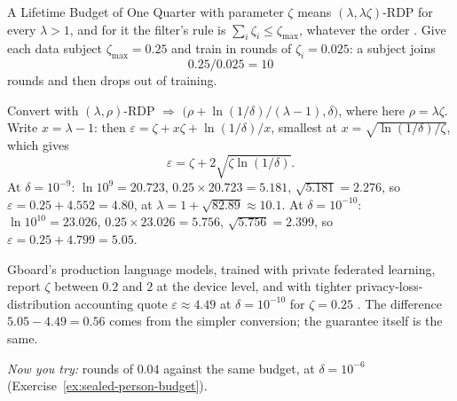 \begin{pdexample}{A Lifetime Budget of One Quarter}
\setlength{\parskip}{4pt plus 1pt}
 with parameter $\zeta$ means $(\lambda,\lambda\zeta)$-RDP
for every $\lambda>1$, and for it the filter's rule is $\sum_i\zeta_i\le\zeta_{\max}$,
whatever the order . Give each data subject
$\zeta_{\max}=0.25$ and train in rounds of $\zeta_i=0.025$: a subject joins
\[
0.25/0.025=10
\]
rounds and then drops out of training.

Convert with $(\lambda,\rho)$-RDP $\Rightarrow$
$\bigl(\rho+\ln(1/\delta)/(\lambda-1),\delta\bigr)$, where here
$\rho=\lambda\zeta$. Write $x=\lambda-1$: then
$\varepsilon=\zeta+x\zeta+\ln(1/\delta)/x$, smallest at
$x=\sqrt{\ln(1/\delta)/\zeta}$, which gives
\[
\varepsilon=\zeta+2\sqrt{\zeta\ln(1/\delta)}.
\]
At $\delta=10^{-9}$: $\ln10^9=20.723$, $0.25\times20.723=5.181$,
$\sqrt{5.181}=2.276$, so $\varepsilon=0.25+4.552=4.80$, at
$\lambda=1+\sqrt{82.89}\approx10.1$. At $\delta=10^{-10}$: $\ln10^{10}=23.026$,
$0.25\times23.026=5.756$, $\sqrt{5.756}=2.399$, so
$\varepsilon=0.25+4.799=5.05$.

Gboard's production language models, trained with private federated learning,
report $\zeta$ between $0.2$ and $2$ at the device level, and with tighter
privacy-loss-distribution accounting quote $\varepsilon\approx4.49$ at
$\delta=10^{-10}$ for $\zeta=0.25$ . The difference
$5.05-4.49=0.56$ comes from the simpler conversion; the guarantee itself is
the same.

\emph{Now you try:} rounds of $0.04$ against the same budget, at
$\delta=10^{-6}$ (Exercise~\ref{ex:sealed-person-budget}).
\end{pdexample}

\pdexercisepointerone{\ref{ex:sealed-person-budget}}{\pageref{ex:sealed-person-budget}}
